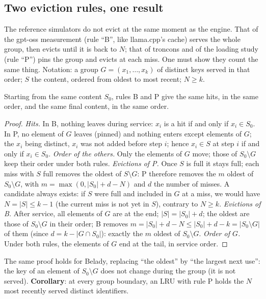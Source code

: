 \subsection{Two eviction rules, one result}

The reference simulators do not evict at the same moment as the engine. That of the gpt-oss measurement (rule \enquote{B}, like llama.cpp's cache) serves the whole group, then evicts until it is back to $N$; that of troncons and of the loading study (rule \enquote{P}) pins the group and evicts at each miss. One must show they count the same thing. Notation: a group $G = (x_1, \ldots, x_k)$ of distinct keys served in that order; $S$ the content, ordered from oldest to most recent; $N \ge k$.

\begin{lemme}\label{lem:t2o-regles}
Starting from the same content $S_0$, rules B and P give the same hits, in the same order, and the same final content, in the same order.
\end{lemme}

\begin{proof}
\emph{Hits.} In B, nothing leaves during service: $x_i$ is a hit if and only if $x_i \in S_0$. In P, no element of $G$ leaves (pinned) and nothing enters except elements of $G$; the $x_i$ being distinct, $x_i$ was not added before step $i$; hence $x_i \in S$ at step $i$ if and only if $x_i \in S_0$.
\emph{Order of the others.} Only the elements of $G$ move; those of $S_0 \setminus G$ keep their order under both rules.
\emph{Evictions of P.} Once $S$ is full it stays full; each miss with $S$ full removes the oldest of $S \setminus G$: P therefore removes the $m$ oldest of $S_0 \setminus G$, with $m = \max(0, |S_0| + d - N)$ and $d$ the number of misses. A candidate always exists: if $S$ were full and included in $G$ at a miss, we would have $N = |S| \le k - 1$ (the current miss is not yet in $S$), contrary to $N \ge k$.
\emph{Evictions of B.} After service, all elements of $G$ are at the end; $|S| = |S_0| + d$; the oldest are those of $S_0 \setminus G$ in their order; B removes $m = |S_0| + d - N \le |S_0| + d - k = |S_0 \setminus G|$ of them (since $d = k - |G \cap S_0|$): exactly the $m$ oldest of $S_0 \setminus G$.
\emph{Order of $G$.} Under both rules, the elements of $G$ end at the tail, in service order.
\end{proof}

The same proof holds for Belady, replacing \enquote{the oldest} by \enquote{the largest next use}: the key of an element of $S_0 \setminus G$ does not change during the group (it is not served). \textbf{Corollary}: at every group boundary, an LRU with rule P holds the $N$ most recently served distinct identifiers.

